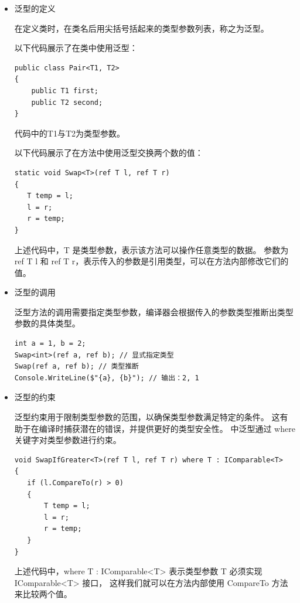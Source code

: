 \begin{itemize}

    \item 泛型的定义

          在定义类时，在类名后用尖括号括起来的类型参数列表，称之为泛型。

          以下代码展示了在类中使用泛型：

          \begin{lstlisting}
public class Pair<T1, T2>
{
    public T1 first;
    public T2 second;
}
\end{lstlisting}

          代码中的T1与T2为类型参数。

          以下代码展示了在方法中使用泛型交换两个数的值：

          \begin{lstlisting}
static void Swap<T>(ref T l, ref T r)
{
   T temp = l;
   l = r;
   r = temp;
}
\end{lstlisting}

          上述代码中，T 是类型参数，表示该方法可以操作任意类型的数据。
          参数为 ref T l 和 ref T r，表示传入的参数是引用类型，可以在方法内部修改它们的值。

    \item 泛型的调用

          泛型方法的调用需要指定类型参数，编译器会根据传入的参数类型推断出类型参数的具体类型。

          \begin{lstlisting}
int a = 1, b = 2;
Swap<int>(ref a, ref b); // 显式指定类型
Swap(ref a, ref b); // 类型推断
Console.WriteLine($"{a}, {b}"); // 输出：2, 1
\end{lstlisting}


    \item 泛型的约束

          泛型约束用于限制类型参数的范围，以确保类型参数满足特定的条件。
          这有助于在编译时捕获潜在的错误，并提供更好的类型安全性。
          \cs 中泛型通过 where 关键字对类型参数进行约束。

          \begin{lstlisting}  
void SwapIfGreater<T>(ref T l, ref T r) where T : IComparable<T>
{
   if (l.CompareTo(r) > 0)
   {
       T temp = l;
       l = r;
       r = temp;
   }
}
\end{lstlisting}

          上述代码中，where T : IComparable<T> 表示类型参数 T 必须实现 IComparable<T> 接口，
          这样我们就可以在方法内部使用 CompareTo 方法来比较两个值。


\end{itemize}





